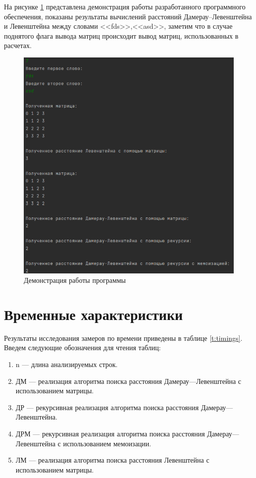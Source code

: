 На рисунке \ref{img:demonstration} представлена демонстрация работы разработанного программного обеспечения, 
показаны результаты вычислений расстояний Дамерау--Левенштейна и Левенштейна между словами <<fds>>,<<asd>>, заметим
что в случае поднятого флага вывода матриц происходит вывод матриц, использованных в расчетах.
\clearpage
\begin{figure}[H]
	\centering
	\includegraphics[height=0.7\textheight]{../img/programm_work.png}
	\caption{Демонстрация работы программы}
	\label{img:demonstration}
\end{figure}

\clearpage

\section{Временные характеристики}

Результаты исследования замеров по времени приведены в таблице \ref{t:timings}.
Введем следующие обозначения для чтения таблиц:
\begin{enumerate}
	\item n --- длина анализируемых строк.
	\item ДМ --- реализация алгоритма поиска расстояния Дамерау---Левенштейна с использованием матрицы.
	\item ДР --- рекурсивная реализация алгоритма поиска расстояния Дамерау---Левенштейна.
	\item ДРМ ---  рекурсивная реализация алгоритма поиска расстояния Дамерау---Левенштейна с использованием мемоизации.
	\item ЛМ --- реализация алгоритма поиска расстояния Левенштейна с использованием матрицы.
\end{enumerate}

